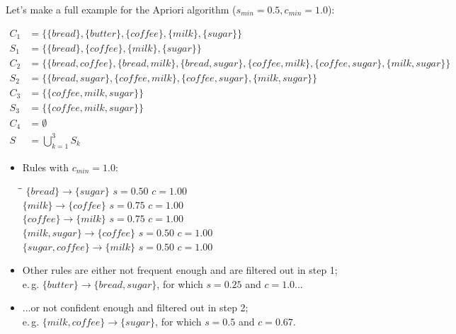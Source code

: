 \begin{frame}
\end{frame}


\begin{frame}
	Let's make a full example for the Apriori algorithm ($s_{min} = 0.5, c_{min} = 1.0$):
	
	\begin{align*}
		C_1 	&= \{ \{ bread \}, \{ butter \}, \{ coffee \}, \{ milk \}, \{ sugar \} \} \\
		S_1 	&= \{ \{ bread \}, \{ coffee \}, \{ milk \}, \{ sugar \} \} \\
		C_2 	&= \{ \{ bread, coffee \}, \{ bread, milk \}, \{ bread, sugar \}, \{ coffee, milk \}, \{ coffee, sugar \}, \{ milk, sugar \} \} \\
		S_2 	&= \{ \{ bread, sugar \}, \{ coffee, milk \}, \{ coffee, sugar \}, \{ milk, sugar \} \} \\
		C_3 	&= \{ \{ coffee, milk, sugar \} \} \\
		S_3 	&= \{ \{ coffee, milk, sugar \} \} \\
		C_4 	&= \emptyset \\
		S 	&= \bigcup_{k=1}^3 S_k
	\end{align*}
\end{frame}


\begin{frame}
	\begin{itemize}
		\item Rules with $c_{min} = 1.0$:
		\begin{tabbing}
			\hspace*{5cm}\=\hspace*{3cm}\=\kill
			$\{ bread \} \rightarrow \{ sugar \}$		\>	$s = 0.50$		\>	$c = 1.00$ 	\\[1.5mm]
			$\{ milk \} \rightarrow \{ coffee \}$		\>	$s = 0.75$		\>	$c = 1.00$ 	\\[1.5mm]
			$\{ coffee \} \rightarrow \{ milk \}$ 		\>	$s = 0.75$		\>	$c = 1.00$		\\[1.5mm]
			$\{ milk, sugar \} \rightarrow \{ coffee \}$	\>	$s = 0.50$		\>	$c = 1.00$		\\[1.5mm]
			$\{ sugar, coffee \} \rightarrow \{ milk \}$	\>	$s = 0.50$		\>	$c = 1.00$
		\end{tabbing}
		\item Other rules are either not frequent enough and are filtered out in step 1; \\
			e.\,g. $\{ butter \} \rightarrow \{ bread, sugar \}$, for which $s = 0.25$ and $c = 1.0$...
		\item ...or not confident enough and filtered out in step 2; \\
			e.\,g. $\{ milk, coffee \} \rightarrow \{ sugar \}$, for which $s = 0.5$ and $c = 0.67$.
	\end{itemize}
\end{frame}


